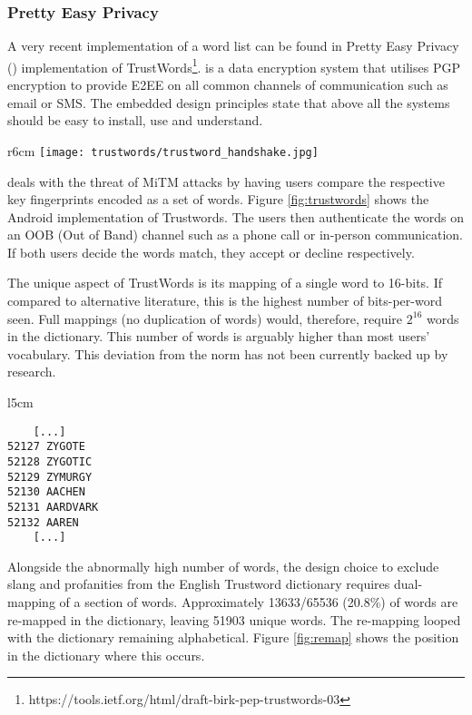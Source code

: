 \newpage
\subsubsection*{Pretty Easy Privacy}
\label{sec:pep}
A very recent implementation of a word list can be found in Pretty Easy Privacy (\pep) implementation of TrustWords\footnote{https://tools.ietf.org/html/draft-birk-pep-trustwords-03}. \pep is a data encryption system that utilises PGP encryption to provide E2EE on all common channels of communication such as email or SMS. The embedded design principles state that above all the systems should be easy to install, use and understand.

\begin{wrapfigure}{r}{6cm}
    \centering
    \texttt{[image: trustwords/trustword\_handshake.jpg]}
    \caption{Trustword fingerprint verification}
    \label{fig:trustwords}
\end{wrapfigure}

\pep deals with the threat of MiTM attacks by having users compare the respective key fingerprints encoded as a set of words. Figure \ref{fig:trustwords} shows the \pep Android implementation of Trustwords. The users then authenticate the words on an OOB (Out of Band) channel such as a phone call or in-person communication. If both users decide the words match, they accept or decline respectively.

The unique aspect of TrustWords is its mapping of a single word to 16-bits. If compared to alternative literature, this is the highest number of bits-per-word seen. Full mappings (no duplication of words) would, therefore, require $2^{16}$ words in the dictionary. This number of words is arguably higher than most users' vocabulary. This deviation from the norm has not been currently backed up by research. 

\begin{wrapfigure}{l}{5cm}
    \centering
    \begin{BVerbatim}
    [...]
52127 ZYGOTE
52128 ZYGOTIC
52129 ZYMURGY
52130 AACHEN
52131 AARDVARK
52132 AAREN
    [...]
    \end{BVerbatim}
    \caption{Re-mapping position in Trustword dictionary}
    \label{fig:remap}
\end{wrapfigure}

Alongside the abnormally high number of words, the design choice to exclude slang and profanities from the English Trustword dictionary requires dual-mapping of a section of words. Approximately 13633/65536 (20.8\%) of words are re-mapped in the dictionary, leaving 51903 unique words. The re-mapping looped with the dictionary remaining alphabetical. Figure \ref{fig:remap} shows the position in the dictionary where this occurs.

